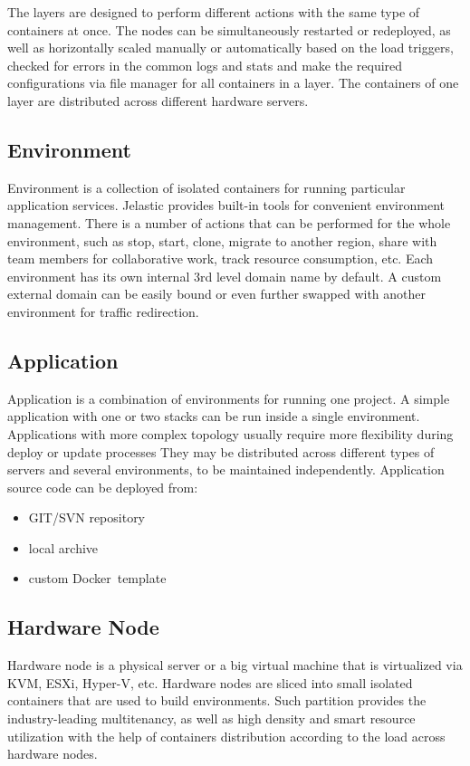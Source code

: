 \documentclass[9pt,twocolumn,twoside]{../../styles/osajnl}
\begin{document}
The layers are designed to perform different actions with the same type of
containers at once. The nodes can be simultaneously restarted or redeployed, as
well as horizontally scaled manually or automatically based on the load triggers,
checked for errors in the common logs and stats and make the required
configurations via file manager for all containers in a layer. The containers of
one layer are distributed across different hardware servers.\cite{www-jelastic5}

\subsection{Environment}
Environment is a collection of isolated containers for running particular
application services. Jelastic provides built-in tools for convenient
environment management. There is a number of actions that can be performed for
the whole environment, such as stop, start, clone, migrate to another region,
share with team members for collaborative work, track resource consumption, etc.
Each environment has its own internal 3rd level domain name by default. A custom
external domain can be easily bound or even further swapped with another
environment for traffic redirection.\cite{www-jelastic2}

\subsection{Application}
Application is a combination of environments for running one project. A simple
application with one or two stacks can be run inside a single environment.
Applications with more complex topology usually require more flexibility during
deploy or update processes They may be distributed across different types of
servers and several environments, to be maintained independently. Application
source code can be deployed from:\cite{paper-jelastic2}
\begin{itemize}
\renewcommand{\labelitemi}{\scriptsize$\square$}
\item GIT/SVN repository
\item local archive
\item custom Docker template
\end{itemize}\cite{www-jelastic1}

\subsection{Hardware Node}
Hardware node is a physical server or a big virtual machine that is virtualized
via KVM, ESXi, Hyper-V, etc. Hardware nodes are sliced into small isolated
containers that are used to build environments. Such partition provides the
industry-leading multitenancy, as well as high density and smart resource
utilization with the help of containers distribution according to the load
across hardware nodes.\cite{www-jelastic3}\cite{paper-jelastic1}
\end{document}
